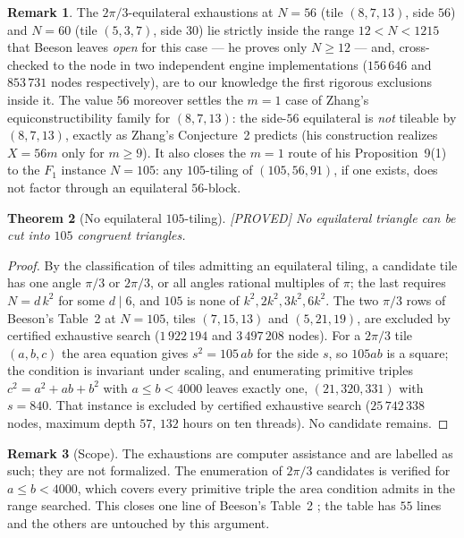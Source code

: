 \documentclass[11pt,reqno]{amsart}
\theoremstyle{plain}
\newtheorem{theorem}{Theorem}
\theoremstyle{definition}
\newtheorem{remark}[theorem]{Remark}
\newcommand{\lab}[1]{\hfill\textnormal{\footnotesize\textsc{[#1]}}}
\begin{document}
\begin{remark}
The $2\pi/3$-equilateral exhaustions at $N=56$ (tile $(8,7,13)$, side $56$) and $N=60$ (tile
$(5,3,7)$, side $30$) lie strictly inside the range $12<N<1215$ that Beeson leaves \emph{open} for
this case --- he proves only $N\ge12$ \cite[\S5]{BeesonEq} --- and, cross-checked to the node in
two independent engine implementations ($156\,646$ and $853\,731$ nodes respectively), are to our
knowledge the first rigorous exclusions inside it. The value $56$ moreover settles the $m{=}1$ case
of Zhang's equiconstructibility family for $(8,7,13)$: the side-$56$ equilateral is \emph{not}
tileable by $(8,7,13)$, exactly as Zhang's Conjecture~2 predicts (his construction realizes $X=56m$
only for $m\ge9$). It also closes the $m{=}1$ route of his Proposition~9(1) to the $F_1$ instance
$N=105$: any $105$-tiling of $(105,56,91)$, if one exists, does not factor through an equilateral
$56$-block.
\end{remark}

\begin{theorem}[No equilateral $105$-tiling]\label{thm:eq105}\lab{PROVED}
No equilateral triangle can be cut into $105$ congruent triangles.
\end{theorem}

\begin{proof}
By the classification of tiles admitting an equilateral tiling, a candidate tile has one angle
$\pi/3$ or $2\pi/3$, or all angles rational multiples of $\pi$; the last requires
$N=d\,k^{2}$ for some $d\mid 6$, and $105$ is none of $k^{2},2k^{2},3k^{2},6k^{2}$. The two
$\pi/3$ rows of Beeson's Table~2 at $N=105$, tiles $(7,15,13)$ and $(5,21,19)$, are excluded by
certified exhaustive search ($1\,922\,194$ and $3\,497\,208$ nodes). For a $2\pi/3$ tile
$(a,b,c)$ the area equation gives $s^{2}=105\,ab$ for the side $s$, so $105ab$ is a square; the
condition is invariant under scaling, and enumerating primitive triples $c^{2}=a^{2}+ab+b^{2}$ with
$a\le b<4000$ leaves exactly one, $(21,320,331)$ with $s=840$. That instance is excluded by
certified exhaustive search ($25\,742\,338$ nodes, maximum depth $57$, $132$ hours on ten
threads). No candidate remains.
\end{proof}

\begin{remark}[Scope]\label{rem:eq105scope}
The exhaustions are computer assistance and are labelled as such; they are not formalized. The
enumeration of $2\pi/3$ candidates is verified for $a\le b<4000$, which covers every primitive
triple the area condition admits in the range searched. This closes one line of Beeson's
Table~2 \cite{BeesonEq}; the table has $55$ lines and the others are untouched by this argument.
\end{remark}
\end{document}
